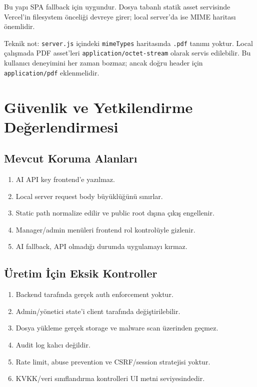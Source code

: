 \documentclass[11pt,a4paper]{article}
\newcommand{\code}[1]{\texttt{#1}}
\begin{document}
Bu yapı SPA fallback için uygundur. Dosya tabanlı statik asset servisinde Vercel'in filesystem önceliği devreye girer; local server'da ise MIME haritası önemlidir.

Teknik not: \code{server.js} içindeki \code{mimeTypes} haritasında \code{.pdf} tanımı yoktur. Local çalışmada PDF asset'leri \code{application/octet-stream} olarak servis edilebilir. Bu kullanıcı deneyimini her zaman bozmaz; ancak doğru header için \code{application/pdf} eklenmelidir.

\section{Güvenlik ve Yetkilendirme Değerlendirmesi}

\subsection{Mevcut Koruma Alanları}

\begin{enumerate}
  \item AI API key frontend'e yazılmaz.
  \item Local server request body büyüklüğünü sınırlar.
  \item Static path normalize edilir ve public root dışına çıkış engellenir.
  \item Manager/admin menüleri frontend rol kontrolüyle gizlenir.
  \item AI fallback, API olmadığı durumda uygulamayı kırmaz.
\end{enumerate}

\subsection{Üretim İçin Eksik Kontroller}

\begin{enumerate}
  \item Backend tarafında gerçek auth enforcement yoktur.
  \item Admin/yönetici state'i client tarafında değiştirilebilir.
  \item Dosya yükleme gerçek storage ve malware scan üzerinden geçmez.
  \item Audit log kalıcı değildir.
  \item Rate limit, abuse prevention ve CSRF/session stratejisi yoktur.
  \item KVKK/veri sınıflandırma kontrolleri UI metni seviyesindedir.
\end{enumerate}
\end{document}
